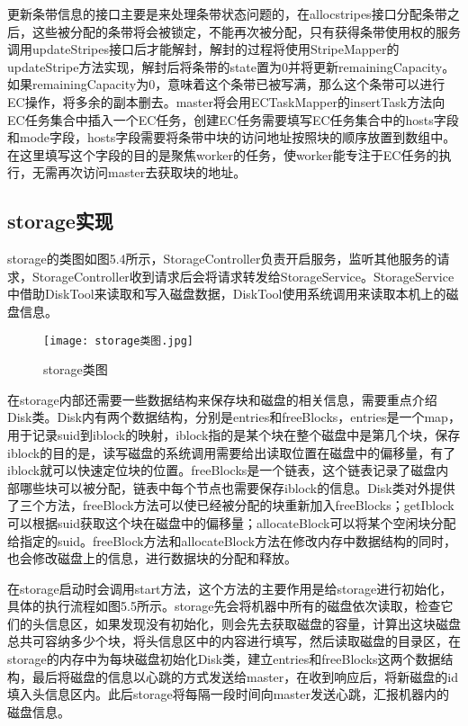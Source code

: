 更新条带信息的接口主要是来处理条带状态问题的，在allocstripes接口分配条带之后，这些被分配的条带将会被锁定，不能再次被分配，只有获得条带使用权的服务调用updateStripes接口后才能解封，解封的过程将使用StripeMapper的updateStripe方法实现，解封后将条带的state置为0并将更新remainingCapacity。如果remainingCapacity为0，意味着这个条带已被写满，那么这个条带可以进行EC操作，将多余的副本删去。master将会用ECTaskMapper的insertTask方法向EC任务集合中插入一个EC任务，创建EC任务需要填写EC任务集合中的hosts字段和mode字段，hosts字段需要将条带中块的访问地址按照块的顺序放置到数组中。在这里填写这个字段的目的是聚焦worker的任务，使worker能专注于EC任务的执行，无需再次访问master去获取块的地址。

\subsection{storage实现}%
storage的类图如图5.4所示，StorageController负责开启服务，监听其他服务的请求，StorageController收到请求后会将请求转发给StorageService。StorageService中借助DiskTool来读取和写入磁盘数据，DiskTool使用系统调用来读取本机上的磁盘信息。

\begin{figure}
  \centering
  \texttt{[image: storage类图.jpg]}
  \caption{storage类图}
\end{figure}

在storage内部还需要一些数据结构来保存块和磁盘的相关信息，需要重点介绍Disk类。Disk内有两个数据结构，分别是entries和freeBlocks，entries是一个map，用于记录suid到iblock的映射，iblock指的是某个块在整个磁盘中是第几个块，保存iblock的目的是，读写磁盘的系统调用需要给出读取位置在磁盘中的偏移量，有了iblock就可以快速定位块的位置。freeBlocks是一个链表，这个链表记录了磁盘内部哪些块可以被分配，链表中每个节点也需要保存iblock的信息。Disk类对外提供了三个方法，freeBlock方法可以使已经被分配的块重新加入freeBlocks；getIblock可以根据suid获取这个块在磁盘中的偏移量；allocateBlock可以将某个空闲块分配给指定的suid。freeBlock方法和allocateBlock方法在修改内存中数据结构的同时，也会修改磁盘上的信息，进行数据块的分配和释放。

在storage启动时会调用start方法，这个方法的主要作用是给storage进行初始化，具体的执行流程如图5.5所示。storage先会将机器中所有的磁盘依次读取，检查它们的头信息区，如果发现没有初始化，则会先去获取磁盘的容量，计算出这块磁盘总共可容纳多少个块，将头信息区中的内容进行填写，然后读取磁盘的目录区，在storage的内存中为每块磁盘初始化Disk类，建立entries和freeBlocks这两个数据结构，最后将磁盘的信息以心跳的方式发送给master，在收到响应后，将新磁盘的id填入头信息区内。此后storage将每隔一段时间向master发送心跳，汇报机器内的磁盘信息。

